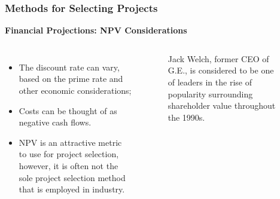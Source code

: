 \documentclass{beamer}
\begin{document}
\begin{frame}
\frametitle{Methods for Selecting Projects}
\textbf{Financial Projections: NPV Considerations}\\
\vspace{0.5cm}
\begin{columns}
\begin{itemize}
\item The discount rate can vary, based on the prime rate and other economic considerations;
\item Costs can be thought of as negative cash flows.
\item NPV is an attractive metric to use for project selection, however, it is often not the sole project selection method that is employed in industry.
\end{itemize}
\begin{figure}
\caption{Jack Welch, former CEO of G.E., is considered to be one of leaders in the rise of popularity surrounding shareholder value throughout the 1990s.}
\end{figure}
\end{columns}
\end{frame}
\end{document}
